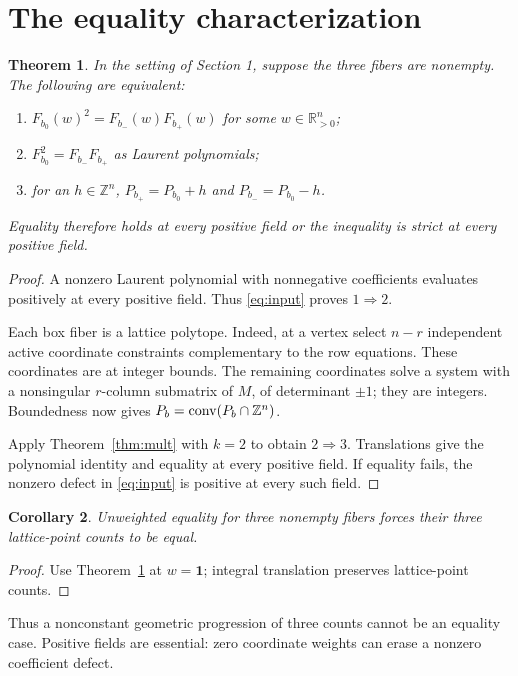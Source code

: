 \documentclass[11pt]{article}
\newtheorem{theorem}{Theorem}[section]
\newtheorem{corollary}[theorem]{Corollary}
\newcommand{\Z}{\mathbb Z}\newcommand{\R}{\mathbb R}\newcommand{\C}{\mathbb C}
\begin{document}
\section{The equality characterization}
\begin{theorem}\label{thm:main}
In the setting of Section 1, suppose the three fibers are nonempty. The following are equivalent:
\begin{enumerate}
\item \(F_{b_0}(w)^2=F_{b_-}(w)F_{b_+}(w)\) for some \(w\in\R_{>0}^n\);
\item \(F_{b_0}^2=F_{b_-}F_{b_+}\) as Laurent polynomials;
\item for an \(h\in\Z^n\),
\(P_{b_+}=P_{b_0}+h\) and \(P_{b_-}=P_{b_0}-h\).
\end{enumerate}
Equality therefore holds at every positive field or the inequality is strict at every positive field.
\end{theorem}
\begin{proof}
A nonzero Laurent polynomial with nonnegative coefficients evaluates positively at every positive field. Thus \eqref{eq:input} proves \(1\Rightarrow2\).

Each box fiber is a lattice polytope. Indeed, at a vertex select \(n-r\) independent active coordinate constraints complementary to the row equations. These coordinates are at integer bounds. The remaining coordinates solve a system with a nonsingular \(r\)-column submatrix of \(M\), of determinant \(\pm1\); they are integers. Boundedness now gives
\(P_b=\conv(P_b\cap\Z^n)\).

Apply Theorem~\ref{thm:mult} with \(k=2\) to obtain \(2\Rightarrow3\).
Translations give the polynomial identity and equality at every positive field. If equality fails, the nonzero defect in \eqref{eq:input} is positive at every such field.
\end{proof}

\begin{corollary}\label{cor:equal}
Unweighted equality for three nonempty fibers forces their three lattice-point counts to be equal.
\end{corollary}
\begin{proof}
Use Theorem~\ref{thm:main} at \(w=\mathbf1\); integral translation preserves lattice-point counts.
\end{proof}
Thus a nonconstant geometric progression of three counts cannot be an equality case. Positive fields are essential: zero coordinate weights can erase a nonzero coefficient defect.
\end{document}
